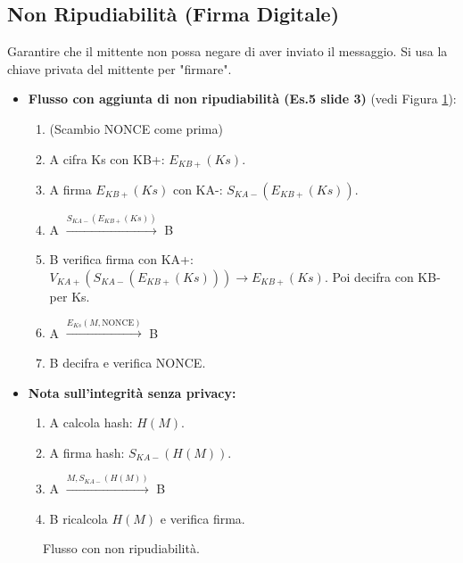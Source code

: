 \documentclass{article}
\begin{document}
\subsection{Non Ripudiabilità (Firma Digitale)}
Garantire che il mittente non possa negare di aver inviato il messaggio. Si usa la chiave privata del mittente per "firmare".
\begin{itemize}
    \item \textbf{Flusso con aggiunta di non ripudiabilità (Es.5 slide 3)} (vedi Figura \ref{fig:nonrep_flow}):
    \begin{enumerate}
        \item (Scambio NONCE come prima)
        \item A cifra Ks con KB+: $E_{KB+}(Ks)$.
        \item A firma $E_{KB+}(Ks)$ con KA-: $S_{KA-}(E_{KB+}(Ks))$.
        \item A $\xrightarrow{S_{KA-}(E_{KB+}(Ks))}$ B
        \item B verifica firma con KA+: $V_{KA+}(S_{KA-}(E_{KB+}(Ks))) \rightarrow E_{KB+}(Ks)$. Poi decifra con KB- per Ks.
        \item A $\xrightarrow{E_{Ks}(M, \text{NONCE})}$ B
        \item B decifra e verifica NONCE.
    \end{enumerate}
    \item \textbf{Nota sull'integrità senza privacy:}
    \begin{enumerate}
        \item A calcola hash: $H(M)$.
        \item A firma hash: $S_{KA-}(H(M))$.
        \item A $\xrightarrow{M, S_{KA-}(H(M))}$ B
        \item B ricalcola $H(M)$ e verifica firma.
    \end{enumerate}
\end{itemize}

\begin{figure}[H]
\centering
{}
\caption{Flusso con non ripudiabilità.}
\label{fig:nonrep_flow}
\end{figure}
\end{document}
